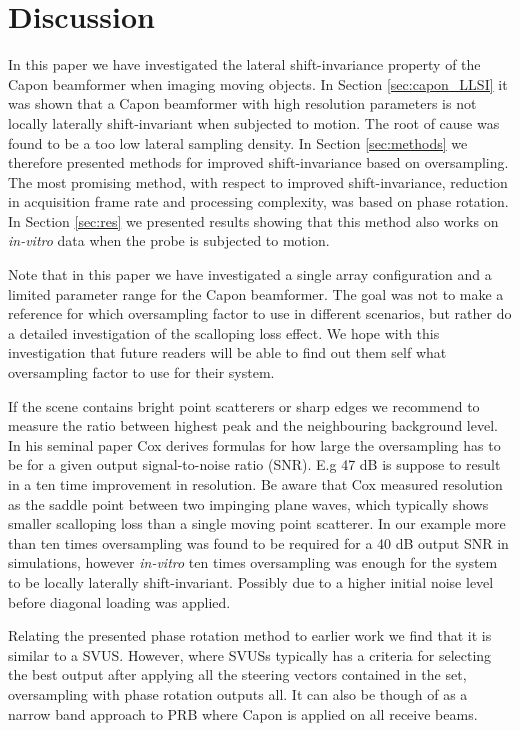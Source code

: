 \documentclass[journal]{IEEEtran}
\begin{document}
\section{Discussion}\label{sec:dis}
In this paper we have investigated the lateral shift-invariance property of the Capon beamformer when imaging moving objects. In Section \ref{sec:capon_LLSI} it was shown that a Capon beamformer with high resolution parameters is not locally laterally shift-invariant when subjected to motion. The root of cause was found to be a too low lateral sampling density. In Section \ref{sec:methods} we therefore presented methods for improved shift-invariance based on oversampling. The most promising method, with respect to improved shift-invariance, reduction in acquisition frame rate and processing complexity, was based on phase rotation. In Section \ref{sec:res} we presented results showing that this method also works on \textit{in-vitro} data when the probe is subjected to motion.

Note that in this paper we have investigated a single array configuration and a limited parameter range for the Capon beamformer. The goal was not to make a reference for which oversampling factor to use in different scenarios, but rather do a detailed investigation of the scalloping loss effect. We hope with this investigation that future readers will be able to find out them self what oversampling factor to use for their system. 

If the scene contains bright point scatterers or sharp edges we recommend to measure the ratio between highest peak and the neighbouring background level. In his seminal paper \cite{Cox1973} Cox derives formulas for how large the oversampling has to be for a given output signal-to-noise ratio (SNR). E.g 47 dB is suppose to result in a ten time improvement in resolution. Be aware that Cox measured resolution as the saddle point between two impinging plane waves, which typically shows smaller scalloping loss than a single moving point scatterer. In our example more than ten times oversampling was found to be required for a 40 dB output SNR in simulations, however \textit{in-vitro} ten times oversampling was enough for the system to be locally laterally shift-invariant. Possibly due to a higher initial noise level before diagonal loading was applied.

Relating the presented phase rotation method to earlier work we find that it is similar to a SVUS. However, where SVUSs typically has a criteria for selecting the best output after applying all the steering vectors contained in the set, oversampling with phase rotation outputs all. It can also be though of as a narrow band approach to PRB where Capon is applied on all receive beams.
\end{document}

